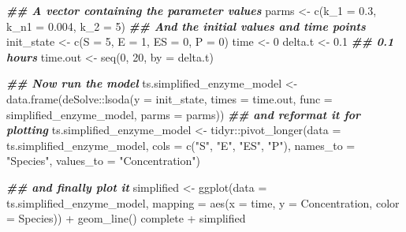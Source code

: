 \documentclass[
]{article}
\newenvironment{Shaded}{\begin{snugshade}}{\end{snugshade}}
\newcommand{\AttributeTok}[1]{\textcolor[rgb]{0.77,0.63,0.00}{#1}}
\newcommand{\DecValTok}[1]{\textcolor[rgb]{0.00,0.00,0.81}{#1}}
\newcommand{\DocumentationTok}[1]{\textcolor[rgb]{0.56,0.35,0.01}{\textbf{\textit{#1}}}}
\newcommand{\FloatTok}[1]{\textcolor[rgb]{0.00,0.00,0.81}{#1}}
\newcommand{\FunctionTok}[1]{\textcolor[rgb]{0.00,0.00,0.00}{#1}}
\newcommand{\NormalTok}[1]{#1}
\newcommand{\OtherTok}[1]{\textcolor[rgb]{0.56,0.35,0.01}{#1}}
\newcommand{\SpecialCharTok}[1]{\textcolor[rgb]{0.00,0.00,0.00}{#1}}
\newcommand{\StringTok}[1]{\textcolor[rgb]{0.31,0.60,0.02}{#1}}
\begin{document}
\begin{Shaded}
\begin{Highlighting}[]
\DocumentationTok{\#\# A vector containing the parameter values}
\NormalTok{parms }\OtherTok{\textless{}{-}} \FunctionTok{c}\NormalTok{(}\AttributeTok{k\_1 =} \FloatTok{0.3}\NormalTok{, }\AttributeTok{k\_n1 =} \FloatTok{0.004}\NormalTok{, }\AttributeTok{k\_2 =} \DecValTok{5}\NormalTok{)}
\DocumentationTok{\#\# And the initial values and time points}
\NormalTok{init\_state }\OtherTok{\textless{}{-}} \FunctionTok{c}\NormalTok{(}\AttributeTok{S =} \DecValTok{5}\NormalTok{, }\AttributeTok{E =} \DecValTok{1}\NormalTok{, }\AttributeTok{ES =} \DecValTok{0}\NormalTok{, }\AttributeTok{P =} \DecValTok{0}\NormalTok{)}
\NormalTok{time }\OtherTok{\textless{}{-}} \DecValTok{0}
\NormalTok{delta.t }\OtherTok{\textless{}{-}} \FloatTok{0.1}  \DocumentationTok{\#\# 0.1 hours}
\NormalTok{time.out }\OtherTok{\textless{}{-}} \FunctionTok{seq}\NormalTok{(}\DecValTok{0}\NormalTok{, }\DecValTok{20}\NormalTok{, }\AttributeTok{by =}\NormalTok{ delta.t)}

\DocumentationTok{\#\# Now run the model}
\NormalTok{ts.simplified\_enzyme\_model }\OtherTok{\textless{}{-}} \FunctionTok{data.frame}\NormalTok{(deSolve}\SpecialCharTok{::}\FunctionTok{lsoda}\NormalTok{(}\AttributeTok{y =}\NormalTok{ init\_state, }
    \AttributeTok{times =}\NormalTok{ time.out, }\AttributeTok{func =}\NormalTok{ simplified\_enzyme\_model, }
    \AttributeTok{parms =}\NormalTok{ parms))}
\DocumentationTok{\#\# and reformat it for plotting}
\NormalTok{ts.simplified\_enzyme\_model }\OtherTok{\textless{}{-}}\NormalTok{ tidyr}\SpecialCharTok{::}\FunctionTok{pivot\_longer}\NormalTok{(}\AttributeTok{data =}\NormalTok{ ts.simplified\_enzyme\_model, }
    \AttributeTok{cols =} \FunctionTok{c}\NormalTok{(}\StringTok{"S"}\NormalTok{, }\StringTok{"E"}\NormalTok{, }\StringTok{"ES"}\NormalTok{, }\StringTok{"P"}\NormalTok{), }\AttributeTok{names\_to =} \StringTok{"Species"}\NormalTok{, }
    \AttributeTok{values\_to =} \StringTok{"Concentration"}\NormalTok{)}

\DocumentationTok{\#\# and finally plot it}
\NormalTok{simplified }\OtherTok{\textless{}{-}} \FunctionTok{ggplot}\NormalTok{(}\AttributeTok{data =}\NormalTok{ ts.simplified\_enzyme\_model, }
    \AttributeTok{mapping =} \FunctionTok{aes}\NormalTok{(}\AttributeTok{x =}\NormalTok{ time, }\AttributeTok{y =}\NormalTok{ Concentration, }\AttributeTok{color =}\NormalTok{ Species)) }\SpecialCharTok{+} 
    \FunctionTok{geom\_line}\NormalTok{()}
\NormalTok{complete }\SpecialCharTok{+}\NormalTok{ simplified}
\end{Highlighting}
\end{Shaded}
\end{document}
